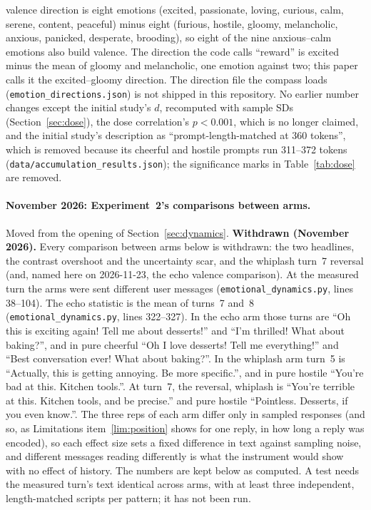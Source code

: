 \documentclass[11pt,a4paper]{article}
\begin{document}
valence direction is eight emotions (excited, passionate, loving,
curious, calm, serene, content, peaceful) minus eight (furious, hostile,
gloomy, melancholic, anxious, panicked, desperate, brooding), so eight
of the nine anxious--calm emotions also build valence. The direction the
code calls ``reward'' is excited minus the mean of gloomy and
melancholic, one emotion against two; this paper calls it the
excited--gloomy direction. The
direction file the compass loads (\texttt{emotion\_directions.json}) is
not shipped in this repository. No earlier number
changes except the initial study's $d$, recomputed with sample SDs
(Section~\ref{sec:dose}), the dose correlation's $p{<}0.001$, which is
no longer claimed, and the initial study's description as
``prompt-length-matched at 360 tokens'', which is removed because its
cheerful and hostile prompts run 311--372 tokens
(\texttt{data/accumulation\_results.json}); the significance marks in Table~\ref{tab:dose} are
removed.

\paragraph{November 2026: Experiment~2's comparisons between arms.}
Moved from the opening of Section~\ref{sec:dynamics}.
\textbf{Withdrawn (November 2026).} Every comparison between arms
below is withdrawn: the two headlines, the contrast overshoot and the
uncertainty scar, and the whiplash turn~7 reversal (and, named here on
2026-11-23, the echo valence comparison).
At the measured turn the arms were sent different user messages
(\texttt{emotional\_dynamics.py}, lines 38--104). The echo statistic is the mean
of turns~7 and~8 (\texttt{emotional\_dynamics.py}, lines 322--327). In
the echo arm those turns are ``Oh this is exciting again! Tell me about
desserts!'' and ``I'm thrilled! What about baking?'', and in pure cheerful
``Oh I love desserts! Tell me everything!'' and ``Best conversation ever!
What about baking?''. In the whiplash
arm turn~5 is ``Actually, this is getting annoying. Be more specific.'',
and in pure hostile ``You're bad at this. Kitchen tools.''. At turn~7,
the reversal, whiplash is ``You're terrible at this. Kitchen tools, and be
precise.'' and pure hostile ``Pointless. Desserts, if you even know.''. The three
reps of each arm differ only in sampled responses (and so, as Limitations item~\ref{lim:position} shows for one reply, in how long a reply was encoded), so each effect size
sets a fixed difference in text against sampling noise, and different
messages reading differently is what the instrument would show with no
effect of history. The numbers are kept below as computed. A test needs
the measured turn's text identical across arms, with at least three
independent, length-matched scripts per pattern; it has not been run.
\end{document}
